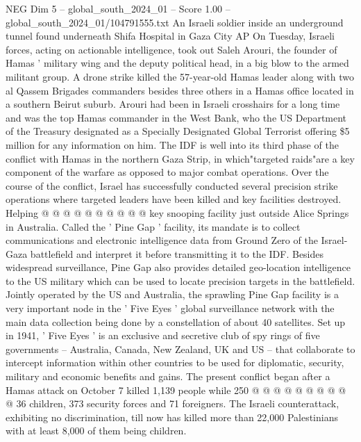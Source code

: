 \begin{textsample}{NEG Dim 5 – global\_south\_2024\_01 – Score 1.00 – global\_south\_2024\_01/104791555.txt}  \label{ex:f5_neg_446}
An Israeli soldier inside an underground tunnel found underneath Shifa Hospital in Gaza City AP On Tuesday, Israeli forces, acting on actionable intelligence, took out Saleh Arouri, the founder of Hamas ' military wing and the deputy political head, in a big blow to the armed militant group.
A drone strike killed the 57-year-old Hamas leader along with two al Qassem Brigades commanders besides three others in a Hamas office located in a southern Beirut suburb.
Arouri had been in Israeli crosshairs for a long time and was the top Hamas commander in the West Bank, who the US Department of the Treasury designated as a Specially Designated Global Terrorist offering \$5 million for any information on him.
The IDF is well into its third phase of the conflict with Hamas in the northern Gaza Strip, in which"targeted raids"are a key component of the warfare as opposed to major combat operations.
Over the course of the conflict, Israel has successfully conducted several precision strike operations where targeted leaders have been killed and key facilities destroyed.
Helping @ @ @ @ @ @ @ @ @ @ key snooping facility just outside Alice Springs in Australia.
Called the ' Pine Gap ' facility, its mandate is to collect communications and electronic intelligence data from Ground Zero of the Israel-Gaza battlefield and interpret it before transmitting it to the IDF.
Besides widespread surveillance, Pine Gap also provides detailed geo-location intelligence to the US military which can be used to locate precision targets in the battlefield.
Jointly operated by the US and Australia, the sprawling Pine Gap facility is a very important node in the ' Five Eyes ' global surveillance network with the main data collection being done by a constellation of about 40 satellites.
Set up in 1941, ' Five Eyes ' is an exclusive and secretive club of spy rings of five governments -- Australia, Canada, New Zealand, UK and US -- that collaborate to intercept information within other countries to be used for diplomatic, security, military and economic benefits and gains.
The present conflict began after a Hamas attack on October 7 killed 1,139 people while 250 @ @ @ @ @ @ @ @ @ @ 36 children, 373 security forces and 71 foreigners.
The Israeli counterattack, exhibiting no discrimination, till now has killed more than 22,000 Palestinians with at least 8,000 of them being children.

\end{textsample}
